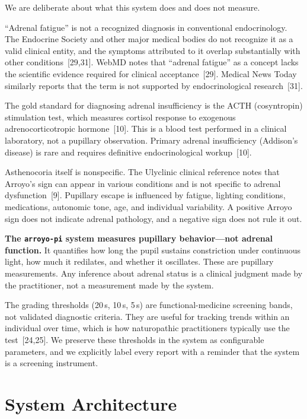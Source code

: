 \documentclass[11pt]{article}
\begin{document}
We are deliberate about what this system does and does not measure.

``Adrenal fatigue'' is not a recognized diagnosis in conventional
endocrinology. The Endocrine Society and other major medical bodies do not
recognize it as a valid clinical entity, and the symptoms attributed to it
overlap substantially with other conditions~[29,31]. WebMD notes that
``adrenal fatigue'' as a concept lacks the scientific evidence required for
clinical acceptance~[29]. Medical News Today similarly reports that the term
is not supported by endocrinological research~[31].

The gold standard for diagnosing adrenal insufficiency is the ACTH
(cosyntropin) stimulation test, which measures cortisol response to exogenous
adrenocorticotropic hormone~[10]. This is a blood test performed in a
clinical laboratory, not a pupillary observation. Primary adrenal
insufficiency (Addison's disease) is rare and requires definitive
endocrinological workup~[10].

Asthenocoria itself is nonspecific. The Ulyclinic clinical reference notes
that Arroyo's sign can appear in various conditions and is not specific to
adrenal dysfunction~[9]. Pupillary escape is influenced by fatigue, lighting
conditions, medications, autonomic tone, age, and individual variability. A
positive Arroyo sign does not indicate adrenal pathology, and a negative sign
does not rule it out.

\textbf{The \texttt{arroyo-pi} system measures pupillary behavior---not
adrenal function.} It quantifies how long the pupil sustains constriction
under continuous light, how much it redilates, and whether it oscillates.
These are pupillary measurements. Any inference about adrenal status is a
clinical judgment made by the practitioner, not a measurement made by the
system.

The grading thresholds (20\,s, 10\,s, 5\,s) are functional-medicine screening
bands, not validated diagnostic criteria. They are useful for tracking trends
within an individual over time, which is how naturopathic practitioners
typically use the test~[24,25]. We preserve these thresholds in the system
as configurable parameters, and we explicitly label every report with a
reminder that the system is a screening instrument.

\section{System Architecture}
\end{document}
